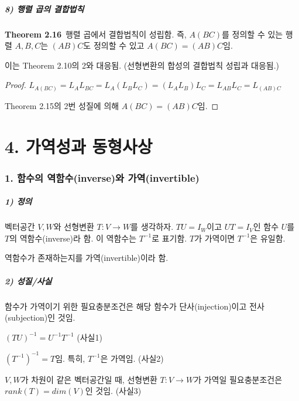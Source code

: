 \subsubsection*{8) 행렬 곱의 결합법칙}
\textbf{Theorem 2.16}\, 행렬 곱에서 결합법칙이 성립함. 즉, $A(BC)$를 정의할 수 있는 행렬 $A,B,C$는 $(AB)C$도 정의할 수 있고 $A(BC)=(AB)C$임.

이는 Theorem 2.10의 2와 대응됨. (선형변환의 합성의 결합법칙 성립과 대응됨.)

\begin{proof}
$L_{A(BC)}=L_{A}L_{BC}=L_{A}(L_{B}L_{C})=(L_{A}L_{B})L_{C}=L_{AB}L_{C}=L_{(AB)C}$

Theorem 2.15의 2번 성질에 의해 $A(BC)=(AB)C$임.
\end{proof}


\newpage


\part*{4. 가역성과 동형사상}

\section*{1. 함수의 역함수(inverse)와 가역(invertible)}

\subsubsection*{1) 정의\\}
\begin{DEF}
벡터공간 $V,W$와 선형변환 $T:V \rightarrow W$를 생각하자. $TU=I_W$이고 $UT=I_V$인 함수 $U$를 $T$의 역함수(inverse)라 함. 이 역함수는 $T^{-1}$로 표기함. $T$가 가역이면 $T^{-1}$은 유일함.

역함수가 존재하는지를 가역(invertible)이라 함.
\end{DEF}

\subsubsection*{2) 성질/사실}
함수가 가역이기 위한 필요충분조건은 해당 함수가 단사(injection)이고 전사(subjection)인 것임.

$(TU)^{-1}=U^{-1}T^{-1}$ (사실1)

$(T^{-1})^{-1}=T$임. 특히, $T^{-1}$은 가역임. (사실2)

$V,W$가 차원이 같은 벡터공간일 때, 선형변환 $T:V \rightarrow W$가 가역일 필요충분조건은 $rank(T)=dim(V)$인 것임. (사실3)

